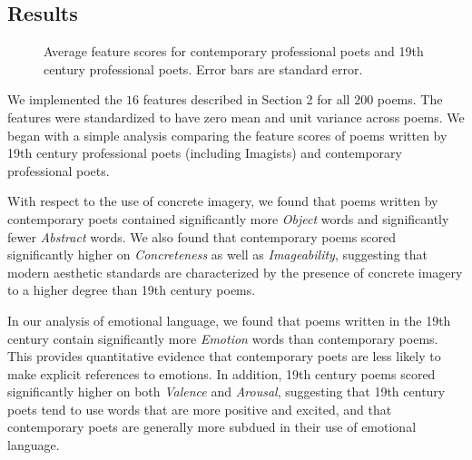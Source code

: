 \documentclass{book}
\begin{document}
\subsection{Results}

\begin{figure}
\label{fig1}
\caption{Average feature scores for contemporary professional poets and 19th century professional poets. Error bars are standard error.} 
\end{figure}

We implemented the $16$ features described in Section 2 for all $200$ poems. The features were standardized to have zero mean and unit variance across poems. We began with a simple analysis comparing the feature scores of poems written by 19th century professional poets (including Imagists) and contemporary professional poets. 

With respect to the use of concrete imagery, we found that poems written by contemporary poets contained significantly more \emph{Object} words and significantly fewer \emph{Abstract} words.
We also found that contemporary poems scored significantly higher on \emph{Concreteness} as well as \emph{Imageability}, suggesting that modern aesthetic standards are characterized by the presence of concrete imagery to a higher degree than 19th century poems.

In our analysis of emotional language, we found that poems written in the 19th century contain significantly more \emph{Emotion} words than contemporary poems. This provides quantitative evidence that contemporary poets are less likely to make explicit references to emotions. In addition, 19th century poems scored significantly higher on both \emph{Valence} and \emph{Arousal}, suggesting that 19th century poets tend to use words that are more positive and excited, and that contemporary poets are generally more subdued in their use of emotional language. 
\end{document}

